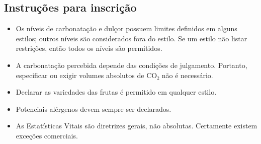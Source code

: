 \subsection*{Instruções para inscrição}

\begin{itemize}
\item Os níveis de carbonatação e dulçor possuem limites definidos em alguns estilos; outros níveis são considerados fora do estilo. Se um estilo não listar restrições, então todos os níveis são permitidos.
\item A carbonatação percebida depende das condições de julgamento. Portanto, especificar ou exigir volumes absolutos de CO₂ não é necessário.
\item Declarar as variedades das frutas é permitido em qualquer estilo.
\item Potenciais alérgenos devem sempre ser declarados.
\item As Estatísticas Vitais são diretrizes gerais, não absolutas. Certamente existem exceções comerciais.
\end{itemize}
